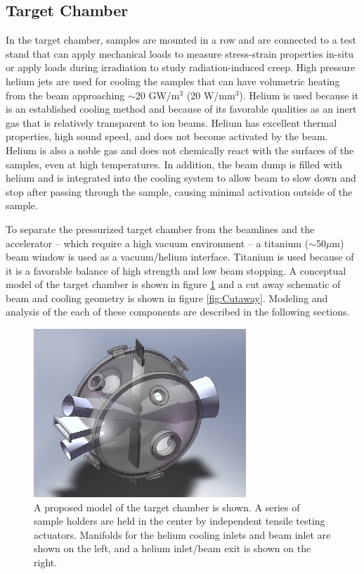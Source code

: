 \documentclass[final,3p,times,twocolumn]{elsarticle} %
\begin{document}
\subsection{Target Chamber}
In the target chamber, samples are mounted in a row and are connected to a test stand that can apply mechanical loads to measure stress-strain properties in-situ or apply loads during irradiation to study radiation-induced creep.  High pressure helium jets are used for cooling the samples that can have volumetric heating from the beam approaching $\sim$20 GW/m$^3$ (20 W/mm$^3$).  Helium is used because it is an established cooling method and because of its favorable qualities as an inert gas that is relatively transparent to ion beams. Helium has excellent thermal properties, high sound speed, and does not become activated by the beam.  Helium is also a noble gas and does not chemically react with the surfaces of the samples, even at high temperatures.  In addition, the beam dump is filled with helium and is integrated into the cooling system to allow beam to slow down and stop after passing through the sample, causing minimal activation outside of the sample.

To separate the pressurized target chamber from the beamlines and the accelerator -- which require a high vacuum environment -- a titanium ($\sim$50$\mu$m) beam window is used as a vacuum/helium interface.  Titanium is used because of it is a favorable balance of high strength and low beam stopping.  A conceptual model of the target chamber is shown in figure \ref{fig:Chamber1} and a cut away schematic of beam and cooling geometry is shown in figure \ref{fig:Cutaway}.  Modeling and analysis of the each of these components are described in the following sections.

\begin{figure}[htbp]
\begin{center}
\includegraphics[width=80mm]{Figures/Chamber1.JPG}
\caption{A proposed model of the target chamber is shown. A series of sample holders are held in the center by independent tensile testing actuators.  Manifolds for the helium cooling inlets and beam inlet are shown on the left, and a helium inlet/beam exit is shown on the right.}
\label{fig:Chamber1}
\end{center}
\end{figure}
\end{document}
